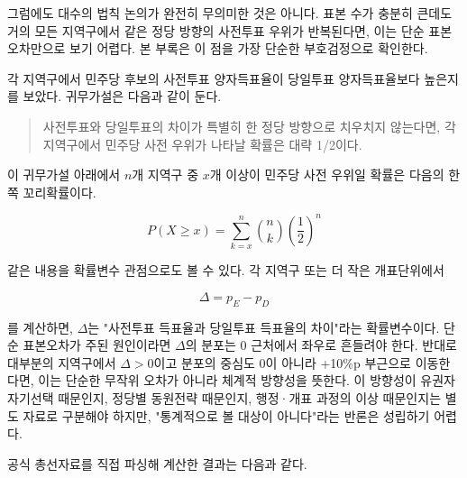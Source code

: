 \documentclass[preprint]{IEIE}
\begin{document}
그럼에도 대수의 법칙 논의가 완전히 무의미한 것은 아니다. 표본 수가 충분히 큰데도 거의 모든 지역구에서 같은 정당 방향의 사전투표 우위가 반복된다면, 이는 단순 표본오차만으로 보기 어렵다. 본 부록은 이 점을 가장 단순한 부호검정으로 확인한다.

각 지역구에서 민주당 후보의 사전투표 양자득표율이 당일투표 양자득표율보다 높은지를 보았다. 귀무가설은 다음과 같이 둔다.

\begin{quote}
사전투표와 당일투표의 차이가 특별히 한 정당 방향으로 치우치지 않는다면, 각 지역구에서 민주당 사전 우위가 나타날 확률은 대략 1/2이다.
\end{quote}

이 귀무가설 아래에서 \(n\)개 지역구 중 \(x\)개 이상이 민주당 사전 우위일 확률은 다음의 한쪽 꼬리확률이다.

\[
P(X \ge x) = \sum_{k=x}^{n} \binom{n}{k}\left(\frac{1}{2}\right)^n
\]

같은 내용을 확률변수 관점으로도 볼 수 있다. 각 지역구 또는 더 작은 개표단위에서

\[
\Delta = p_E - p_D
\]

를 계산하면, \(\Delta\)는 "사전투표 득표율과 당일투표 득표율의 차이"라는 확률변수이다. 단순 표본오차가 주된 원인이라면 \(\Delta\)의 분포는 0 근처에서 좌우로 흔들려야 한다. 반대로 대부분의 지역구에서 \(\Delta>0\)이고 분포의 중심도 0이 아니라 +10\%p 부근으로 이동한다면, 이는 단순한 무작위 오차가 아니라 체계적 방향성을 뜻한다. 이 방향성이 유권자 자기선택 때문인지, 정당별 동원전략 때문인지, 행정·개표 과정의 이상 때문인지는 별도 자료로 구분해야 하지만, "통계적으로 볼 대상이 아니다"라는 반론은 성립하기 어렵다.

공식 총선자료를 직접 파싱해 계산한 결과는 다음과 같다.

\begin{center}
\scriptsize
{}
\end{center}
\end{document}
